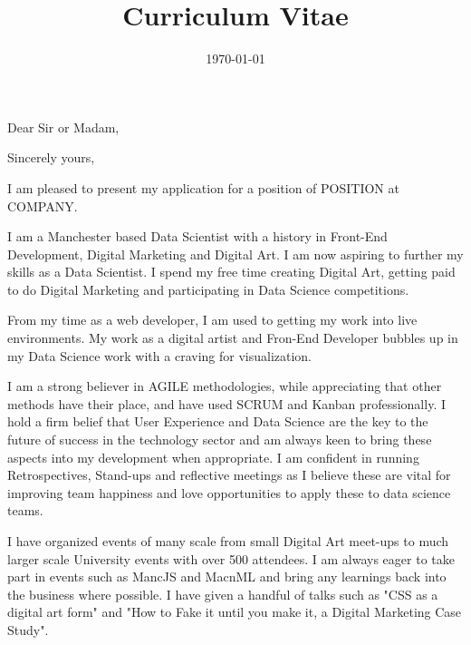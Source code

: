 \documentclass[11pt,a4paper,sans]{moderncv} %
\title{Curriculum Vitae}
\begin{document}


\clearpage

\date{\today} %
\opening{Dear Sir or Madam,} %
\closing{Sincerely yours,} %

\makelettertitle %

I am pleased to present my application for a position of POSITION at COMPANY.

I am a Manchester based Data Scientist with a history in Front-End Development, Digital Marketing and Digital Art. I am now aspiring to further my skills as a Data Scientist. I spend my free time creating Digital Art, getting paid to do Digital Marketing and participating in Data Science competitions.

From my time as a web developer, I am used to getting my work into live environments. My work as a digital artist and Fron-End Developer bubbles up in my Data Science work with a craving for visualization.

I am a strong believer in AGILE methodologies, while appreciating that other methods have their place, and have used SCRUM and Kanban professionally. I hold a firm belief that User Experience and Data Science are the key to the future of success in the technology sector and am always keen to bring these aspects into my development when appropriate. I am confident in running Retrospectives, Stand-ups and reflective meetings as I believe these are vital for improving team happiness and love opportunities to apply these to data science teams.

I have organized events of many scale from small Digital Art meet-ups to much larger scale University events with over 500 attendees. I am always eager to take part in events such as MancJS and MacnML and bring any learnings back into the business where possible. I have given a handful of talks such as "CSS as a digital art form" and "How to Fake it until you make it, a Digital Marketing Case Study".
\end{document}
